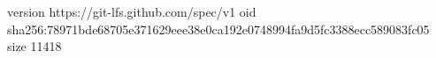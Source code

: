 version https://git-lfs.github.com/spec/v1
oid sha256:78971bde68705e371629eee38e0ca192e0748994fa9d5fc3388ecc589083fc05
size 11418
